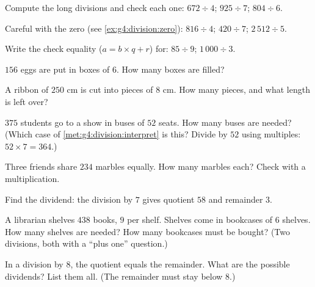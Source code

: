 \begin{exercise}[$\star$]\label{exo:g4:division:2}
Compute the long divisions and check each one:
$672 \div 4$; \quad $925 \div 7$; \quad $804 \div 6$.
\end{exercise}

\begin{exercise}[$\star$]\label{exo:g4:division:3}
Careful with the zero (see \cref{ex:g4:division:zero}):
$816 \div 4$; \quad $420 \div 7$; \quad $2\,512 \div 5$.
\end{exercise}

\begin{exercise}[$\star$]\label{exo:g4:division:4}
Write the check equality ($a = b \times q + r$) for: $85 \div 9$;
\quad $1\,000 \div 3$.
\end{exercise}

\begin{exercise}[$\star$]\label{exo:g4:division:5}
$156$ eggs are put in boxes of $6$. How many boxes are filled?
\end{exercise}

\begin{exercise}[$\star$]\label{exo:g4:division:6}
A ribbon of $250$ cm is cut into pieces of $8$ cm. How many pieces,
and what length is left over?
\end{exercise}

\begin{exercise}[$\star$]\label{exo:g4:division:7}
$375$ students go to a show in buses of $52$ seats. How many buses
are needed? (Which case of
\cref{met:g4:division:interpret} is this? Divide by $52$ using
multiples: $52 \times 7 = 364$.)
\end{exercise}

\begin{exercise}[$\star$]\label{exo:g4:division:8}
Three friends share $234$ marbles equally. How many marbles each?
Check with a multiplication.
\end{exercise}

\begin{exercise}[$\star$]\label{exo:g4:division:9}
Find the dividend: the division by $7$ gives quotient $58$ and
remainder $3$.
\end{exercise}

\begin{exercise}[$\star\star$]\label{exo:g4:division:10}
A librarian shelves $438$ books, $9$ per shelf. Shelves come in
bookcases of $6$ shelves. How many shelves are needed? How many
bookcases must be bought? (Two divisions, both with a
``plus one'' question.)
\end{exercise}

\begin{exercise}[$\star\star$]\label{exo:g4:division:11}
In a division by $8$, the quotient equals the remainder. What are
the possible dividends? List them all. (The remainder must stay
below $8$.)
\end{exercise}
